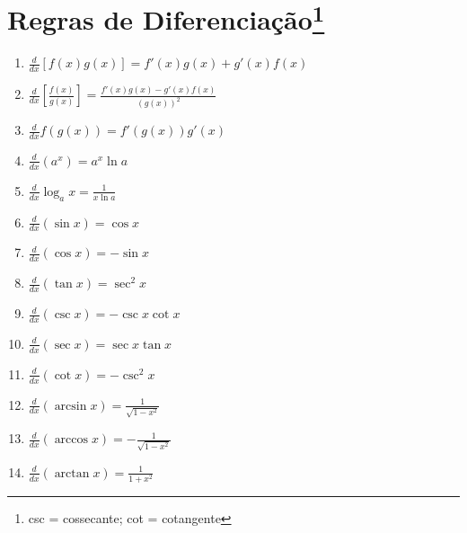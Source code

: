 \documentclass[12pt,openany, letterpaper]{book}
\begin{document}
{{\section*{Regras de Diferenciação\footnote{csc = cossecante; cot = cotangente}}
\begin{multicols}{2}
\begin{enumerate}
\item $\displaystyle{\frac{d}{dx} [f(x)g(x)] = f'(x)g(x) + g'(x)f(x)}$
\item $\displaystyle{\frac{d}{dx} \left[\frac{f(x)}{g(x)}\right] = \frac{f'(x)g(x) - g'(x)f(x)}{(g(x))^2}}$
\item $\displaystyle{\frac{d}{dx} f(g(x)) = f'(g(x))g'(x)}$
\item $\displaystyle{\frac{d}{dx} (a^x) = a^x \ln{a}}$
\item $\displaystyle{\frac{d}{dx} \log_a{x} = \frac{1}{x \ln a}}$
\item $\displaystyle{\frac{d}{dx} (\sin x) = \cos x}$
\item $\displaystyle{\frac{d}{dx} (\cos x) = -\sin x}$
\item $\displaystyle{\frac{d}{dx} (\tan x) = \sec^2 x}$
\item $\displaystyle{\frac{d}{dx} (\csc x) = -\csc x \cot x}$
\item $\displaystyle{\frac{d}{dx} (\sec x) = \sec x \tan x}$
\item $\displaystyle{\frac{d}{dx} (\cot x) = -\csc^2 x}$
\item $\displaystyle{\frac{d}{dx} (\arcsin x) = \frac{1}{\sqrt{1-x^2}}}$
\item $\displaystyle{\frac{d}{dx} (\arccos x) = -\frac{1}{\sqrt{1-x^2}}}$
\item $\displaystyle{\frac{d}{dx} (\arctan x) = \frac{1}{1+x^2}}$
\end{enumerate}
\end{multicols}

}}
\end{document}
